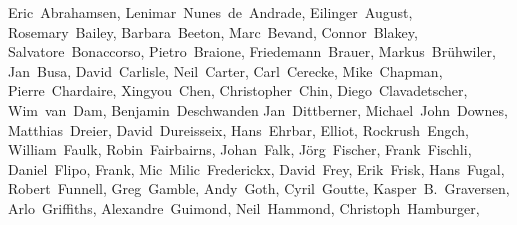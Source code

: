 \begin{flushleft}\small
Eric~Abrahamsen,        %
Lenimar~Nunes~de~Andrade, %
Eilinger~August,        %
Rosemary~Bailey,        %
Barbara~Beeton,         %
Marc~Bevand,            %
Connor~Blakey,          %
Salvatore~Bonaccorso,   %
Pietro~Braione,         %
Friedemann~Brauer,      %
Markus~Br\"uhwiler,     %
Jan~Busa,               %
David~Carlisle,         %
Neil~Carter,            %
Carl~Cerecke,           %
Mike~Chapman,           %
Pierre~Chardaire,       %
Xingyou~Chen,           %
Christopher~Chin,       %
Diego~Clavadetscher,    %
Wim~van~Dam,            %
Benjamin~Deschwanden    %
Jan~Dittberner,         %
Michael~John~Downes,    %
Matthias~Dreier,        %
David~Dureisseix,       %
Hans~Ehrbar,            %
Elliot,                 %
Rockrush~Engch,         %
William~Faulk,          %
Robin~Fairbairns,       %
Johan~Falk,             %
J\"org~Fischer,         %
Frank~Fischli,          %
Daniel~Flipo,           %
Frank,                  %
Mic~Milic~Frederickx,   %
David~Frey,             %
Erik~Frisk,             %
Hans~Fugal,             %
Robert~Funnell,         %
Greg~Gamble,            %
Andy~Goth,              %
Cyril~Goutte,           %
Kasper~B.~Graversen,    %
Arlo~Griffiths,         %
Alexandre~Guimond,      %
Neil~Hammond,           %
Christoph~Hamburger,    %

\end{flushleft}

